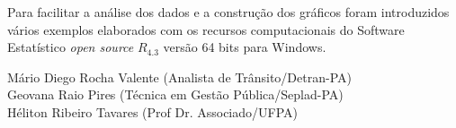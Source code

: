 Para facilitar a análise dos dados e a construção dos gráficos foram introduzidos vários exemplos elaborados com os recursos computacionais do Software Estatístico \textit{open source} \textbf{$R_{4.3}$} versão 64 bits para Windows. 
\vst






\vst
\vst
\vst

\begin{centering}

\vst

\vsm

Mário Diego Rocha Valente (Analista de Trânsito/Detran-PA) \\
Geovana Raio Pires (Técnica em Gestão Pública/Seplad-PA)\\
Héliton Ribeiro Tavares (Prof Dr. Associado/UFPA)\\





\end{centering}
